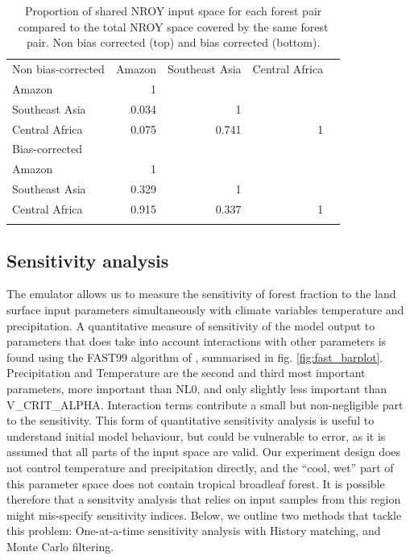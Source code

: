\documentclass[gmd, manuscript]{copernicus}
\begin{document}
\begin{table}[t]
\caption{Proportion of shared NROY input space for each forest pair compared to the total NROY space covered by the same forest pair. Non bias corrected (top) and bias corrected (bottom).}
\begin{tabular}{lrrrr}
\tophline

Non bias-corrected    & Amazon & Southeast Asia & Central Africa  \\
\middlehline
Amazon                &          1        &             &     \\
Southeast Asia      &        0.034  &           1   &    \\
Central Africa         &    0.075 &  0.741  &   1 \\
\bottomhline

\tophline

Bias-corrected      &   &    & \\
\middlehline
Amazon                &          1        &             &     \\
Southeast Asia      &        0.329  &           1   &    \\
Central Africa         &    0.915 & 0.337  &   1 \\
\bottomhline
\end{tabular}
\belowtable{} %
\label{tab:shared_space}
\end{table}

\subsection{Sensitivity analysis}\label{ssec:sensitivity}
The emulator allows us to measure the sensitivity of forest fraction to the land surface input parameters simultaneously with climate variables temperature and precipitation. A quantitative measure of sensitivity of the model output to parameters that does take into account interactions with other parameters is found using the FAST99 algorithm of \cite{saltelli1999sensitivity}, summarised in fig. \ref{fig:fast_barplot}. Precipitation and Temperature are the second and third most important parameters, more important than NL0, and only slightly less important than V\_CRIT\_ALPHA. Interaction terms contribute a small but non-negligible part to the sensitivity. This form of quantitative sensitivity analysis is useful to understand initial model behaviour, but could be vulnerable to error, as it is assumed that all parts of the input space are valid. Our experiment design does not control temperature and precipitation directly, and the ``cool, wet'' part of this parameter space does not contain tropical broadleaf forest. It is possible therefore that a sensitvity analysis that relies on input samples from this region might mis-specify sensitivity indices. Below, we outline two methods that tackle this problem: One-at-a-time sensitivity analysis with History matching, and Monte Carlo filtering.
\end{document}

